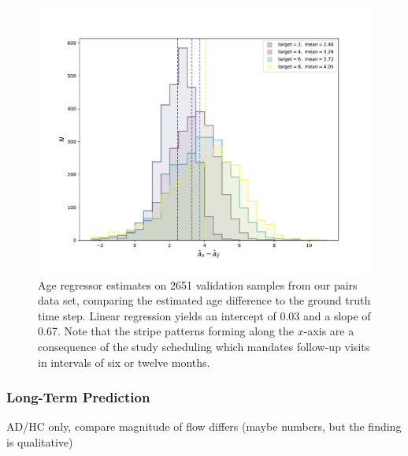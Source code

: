 \begin{figure}
	\centering
	\includegraphics[width=\linewidth]{images/age_plots/hist_fixed}
	\vspace*{-15pt}
	\caption{Age regressor estimates on 2651 validation samples from our pairs data set, comparing the estimated age difference to the ground truth time step. Linear regression yields an intercept of 0.03 and a slope of 0.67. Note that the stripe patterns forming along the $x$-axis are a consequence of the study scheduling which mandates follow-up visits in intervals of six or twelve months.}
	\label{fig:reghistfixed}
\end{figure}

\subsubsection*{Long-Term Prediction}
AD/HC only, compare
magnitude of flow differs (maybe numbers, but the finding is qualitative)



